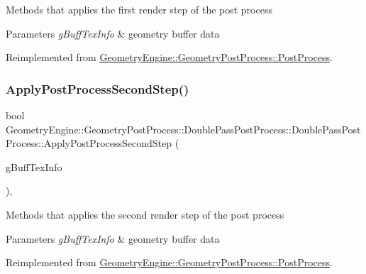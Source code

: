 Methods that applies the first render step of the post process 
\begin{DoxyParams}{Parameters}
{\em g\+Buff\+Tex\+Info} & geometry buffer data \\
\hline
\end{DoxyParams}


Reimplemented from \mbox{\hyperlink{class_geometry_engine_1_1_geometry_post_process_1_1_post_process_a2dbb157265ebdeea658982673e757d46}{Geometry\+Engine\+::\+Geometry\+Post\+Process\+::\+Post\+Process}}.

\mbox{\label{class_geometry_engine_1_1_geometry_post_process_1_1_double_pass_post_process_1_1_double_pass_post_process_a1caac8d2ec6f65de1bb98edd88ba14c6}} 
\subsubsection{\texorpdfstring{ApplyPostProcessSecondStep()}{ApplyPostProcessSecondStep()}}
{\footnotesize\ttfamily bool Geometry\+Engine\+::\+Geometry\+Post\+Process\+::\+Double\+Pass\+Post\+Process\+::\+Double\+Pass\+Post\+Process\+::\+Apply\+Post\+Process\+Second\+Step (\begin{DoxyParamCaption}\item[{const \mbox{\hyperlink{class_geometry_engine_1_1_g_buffer_texture_info}{G\+Buffer\+Texture\+Info}} \&}]{g\+Buff\+Tex\+Info }\end{DoxyParamCaption})\hspace{0.3cm}{\ttfamily [override]}, {\ttfamily [virtual]}}

Methods that applies the second render step of the post process 
\begin{DoxyParams}{Parameters}
{\em g\+Buff\+Tex\+Info} & geometry buffer data \\
\hline
\end{DoxyParams}


Reimplemented from \mbox{\hyperlink{class_geometry_engine_1_1_geometry_post_process_1_1_post_process_a3657f263948ecee70314c859e15412e1}{Geometry\+Engine\+::\+Geometry\+Post\+Process\+::\+Post\+Process}}.


